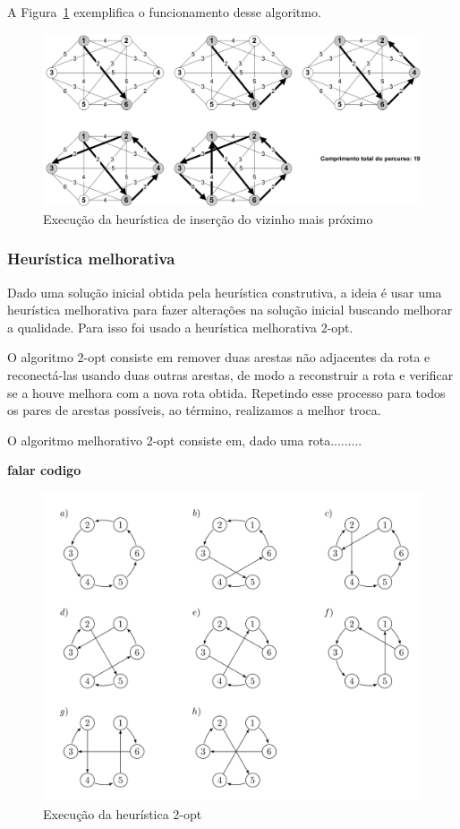 \documentclass[12pt]{article}
\begin{document}
A Figura~\ref{fig:vizinho} exemplifica o funcionamento desse algoritmo.

\begin{figure}[ht]
	\centering
	\includegraphics[width=1\textwidth]{vizinho.png}
	\caption{Execução da heurística de inserção do vizinho mais próximo}
	\label{fig:vizinho}
\end{figure}

\subsubsection{Heurística melhorativa}
Dado uma solução inicial obtida pela heurística construtiva, a ideia é usar uma heurística melhorativa para fazer alterações na solução inicial buscando melhorar a qualidade.
Para isso foi usado a heurística melhorativa 2-opt.

O algoritmo 2-opt consiste em remover duas arestas não adjacentes da rota e reconectá-las usando duas outras arestas, de modo a reconstruir a rota e verificar se a houve melhora com a nova rota obtida. Repetindo esse processo para todos os pares de arestas possíveis, ao término, realizamos a melhor troca.

O algoritmo melhorativo 2-opt consiste em, dado uma rota.........

\textbf{falar codigo}

\begin{figure}[ht]
	\centering
	\includegraphics[width=1\textwidth]{2optnew.png}
	\caption{Execução da heurística 2-opt}
	\label{fig:2optnew}
\end{figure}
\end{document}
